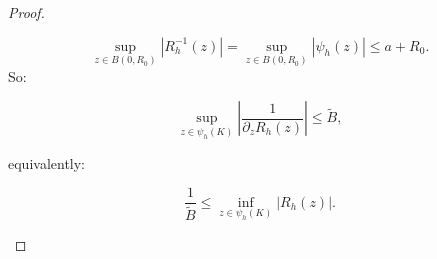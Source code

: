 \documentclass[10pt,a4paper]{amsart}
\begin{document}
\begin{proof}
\begin{itemize}
			\begin{equation}
				\sup_{z\in B(0,R_0)} | R_h^{-1}(z)|=\sup_{z\in B(0,R_0)} | \psi_h(z)|\leq a+R_0.
			\end{equation}
			So:
			
			\begin{equation}
				\sup_{z\in \psi_h(K)}\left|\frac{1}{\partial_z R_h(z)}\right|\leq \tilde{B},
			\end{equation}
			
			equivalently:
			
			\begin{equation}
				\frac{1}{\tilde{B}}\leq \inf_{z\in \psi_h(K)}|R_h(z)|.
			\end{equation}
			
		\end{itemize}
	\end{proof}
\end{document}
